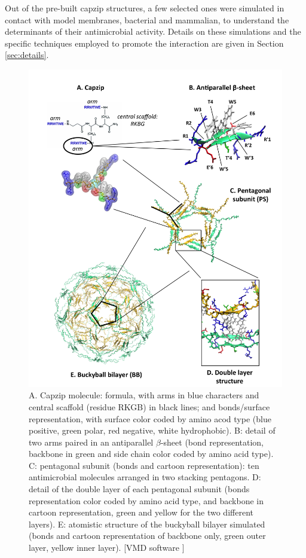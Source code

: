 Out of the pre-built capzip structures, a few selected ones were simulated in contact with model membranes, bacterial and mammalian, to understand the determinants of their antimicrobial activity. Details on these simulations and the specific techniques employed to promote the interaction are given in Section \ref{sec:details}.
%
\begin{figure}[p!]
\centering
	\includegraphics[width=0.95\linewidth]{3results_capsule/pics/img_build.png}
\caption[Building blocks of capzip assembly]{A. Capzip molecule: formula, with arms in blue characters and central scaffold (residue RKGB) in black lines; and bonds/surface representation, with surface color coded by amino acod type (blue positive, green polar, red negative, white hydrophobic).
%
B: detail of two arms paired in an antiparallel $\beta$-sheet (bond representation, backbone in green and side chain color coded by amino acid type).
%
C: pentagonal subunit (bonds and cartoon representation): ten antimicrobial molecules arranged in two stacking pentagons. 
%
D: detail of the double layer of each pentagonal subunit (bonds representation color coded by amino acid type, and backbone in cartoon representation, green and yellow for the two different layers).
%
E: atomistic structure of the buckyball bilayer simulated (bonds and cartoon representation of backbone only, green outer layer, yellow inner layer). [VMD software \citet{HUMP96}]}
\label{fig:BTI_vmd}
\end{figure}



